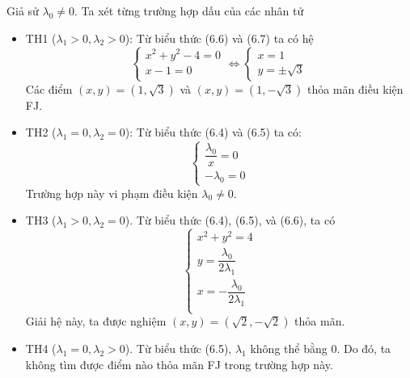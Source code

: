 \begin{solution}
\begin{enumerate}[label=(\alph*)]
        Giả sử $\lambda_0 \ne 0$. Ta xét từng trường hợp dấu của các nhân tử
        \begin{itemize}
            \item TH1 ($\lambda_1 > 0, \lambda_2 > 0$): Từ biểu thức (6.6) và (6.7) ta có hệ 
            \begin{equation}
                \begin{cases}
                    x^2 + y^2 - 4 = 0\\
                    x - 1 = 0\\
                \end{cases}
                \Leftrightarrow 
                \begin{cases}
                    x = 1\\
                    y = \pm \sqrt{3}
                \end{cases}
            \end{equation}
            Các điểm $(x, y) = (1, \sqrt{3})$ và $(x, y) = (1, -\sqrt{3})$ thỏa mãn điều kiện FJ.
            \item TH2 ($\lambda_1 = 0, \lambda_2 = 0$): Từ biểu thức (6.4) và (6.5) ta có:
            \begin{equation}
                \begin{cases}
                    \dfrac{\lambda_0}{x} = 0\\
                    -\lambda_0 = 0
                \end{cases}
            \end{equation}
            Trường hợp này vi phạm điều kiện $\lambda_0 \ne 0$.
            \item TH3 ($\lambda_1 > 0, \lambda_2 = 0$). Từ biểu thức (6.4), (6.5), và (6.6), ta có
            \begin{equation}
                \begin{cases}
                    x^2 + y^2 = 4\\ 
                    y = \dfrac{\lambda_0}{2\lambda_1}\\
                    x = -\dfrac{\lambda_0}{2\lambda_1}\\
                \end{cases}
            \end{equation}
            Giải hệ này, ta được nghiệm $(x, y) = (\sqrt{2}, -\sqrt{2})$ thỏa mãn.
            \item TH4 ($\lambda_1 = 0, \lambda_2 > 0$). Từ biểu thức (6.5), $\lambda_1$ không thể bằng 0. Do đó, ta không tìm được điểm nào thỏa mãn FJ trong trường hợp này.

\end{itemize}
\end{enumerate}
\end{solution}
